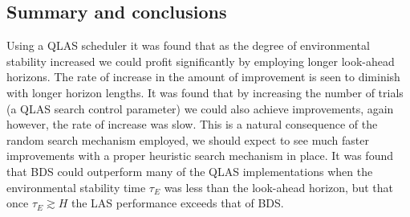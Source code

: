 \subsection{Summary and conclusions}
Using a QLAS scheduler it was found that as the degree of environmental stability increased we could profit significantly by employing longer look-ahead horizons. The rate of increase in the amount of improvement is seen to diminish with longer horizon lengths. It was found that by increasing the number of trials (a QLAS search control parameter) we could also achieve improvements, again however, the rate of increase was slow. This is a natural consequence of the random search mechanism employed, we should expect to see much faster improvements with a proper heuristic search mechanism in place. It was found that BDS could outperform many of the QLAS implementations when the environmental stability time $\tau_E$ was less than the look-ahead horizon, but that once $\tau_E \apprge H$ the LAS performance exceeds that of BDS. 
